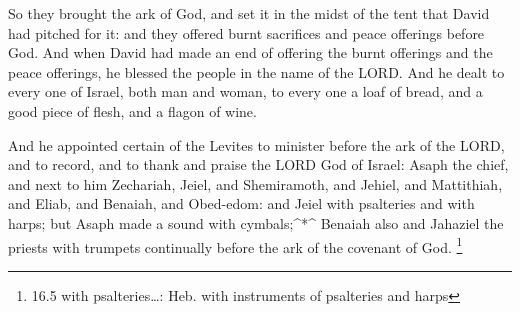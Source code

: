  So they brought the ark of God, and set it in the midst of
the tent that David had pitched for it: and they offered burnt
sacrifices and peace offerings before God.  And when David
had made an end of offering the burnt offerings and the peace offerings,
he blessed the people in the name of the LORD.  And he dealt
to every one of Israel, both man and woman, to every one a loaf of
bread, and a good piece of flesh, and a flagon of wine.

 And he appointed certain of the Levites to minister before
the ark of the LORD, and to record, and to thank and praise the LORD God
of Israel:  Asaph the chief, and next to him Zechariah,
Jeiel, and Shemiramoth, and Jehiel, and Mattithiah, and Eliab, and
Benaiah, and Obed-edom: and Jeiel with psalteries and with harps; but
Asaph made a sound with cymbals;\^{}*\^{}  Benaiah also and
Jahaziel the priests with trumpets continually before the ark of the
covenant of God. \footnote{16.5 with psalteries\ldots: Heb. with
  instruments of psalteries and harps}

